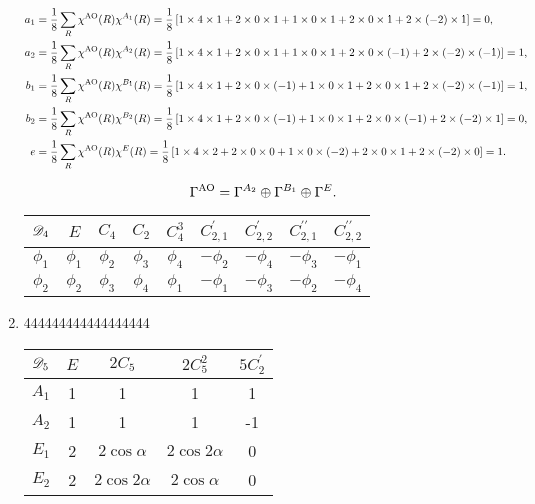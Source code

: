 \documentclass[a4paper]{book}
\newcommand{\AO}{{\rm AO}}
\begin{document}
\begin{solution}
\begin{enumerate}[label=(\alph*)]
		\begin{align*}
		a_1 &= \frac{1}{8} \sum_{R} \chi^{\AO}(R) \chi^{A_1}(R) = \frac{1}{8} \left[ 1 \times 4 \times 1 + 2 \times 0 \times 1 + 1 \times 0 \times 1 + 2 \times 0 \times 1 + 2 \times (-2) \times 1 \right] = 0, \\		
		a_2 &= \frac{1}{8} \sum_{R} \chi^{\AO}(R) \chi^{A_2}(R) = \frac{1}{8} \left[ 1 \times 4 \times 1 + 2 \times 0 \times 1 + 1 \times 0 \times 1 + 2 \times 0 \times (-1) + 2 \times (-2) \times (-1) \right] = 1, \\
		b_1 &= \frac{1}{8} \sum_{R} \chi^{\AO}(R) \chi^{B_1}(R) = \frac{1}{8} \left[ 1 \times 4 \times 1 + 2 \times 0 \times (-1) + 1 \times 0 \times 1 + 2 \times 0 \times 1 + 2 \times (-2) \times (-1) \right] = 1, \\		
		b_2 &= \frac{1}{8} \sum_{R} \chi^{\AO}(R) \chi^{B_2}(R) = \frac{1}{8} \left[ 1 \times 4 \times 1 + 2 \times 0 \times (-1) + 1 \times 0 \times 1 + 2 \times 0 \times (-1) + 2 \times (-2) \times 1 \right] = 0, \\
		e &= \frac{1}{8} \sum_{R} \chi^{\AO}(R) \chi^{E}(R) = \frac{1}{8} \left[ 1 \times 4 \times 2 + 2 \times 0 \times 0 + 1 \times 0 \times (-2) + 2 \times 0 \times 1 + 2 \times (-2) \times 0 \right] = 1.
		\end{align*}
		
		\begin{equation*}
			\Gamma^{\AO} = \Gamma^{A_2} \oplus \Gamma^{B_1} \oplus \Gamma^{E}.
		\end{equation*}
		
		\begin{center}
		\begin{tabular}{ccccccccc}\hline
	$\mathscr{D}_{\rm 4}$ & $E$ & $C_4$ & $C_2$ & $C^3_4$	&	$C^\prime_{2,1}$	&	$C^\prime_{2,2}$ &	$C^{\prime\prime}_{2,1}$	&	$C^{\prime\prime}_{2,2}$	\\ \hline
			$\phi_1$	&	$\phi_1$	&	$\phi_2$	&	$\phi_3$	&	$\phi_4$	&	$-\phi_2$	&	$-\phi_4$	&	$-\phi_3$	&	$-\phi_1$	\\
			$\phi_2$	&	$\phi_2$	&	$\phi_3$	&	$\phi_4$	&	$\phi_1$	&	$-\phi_1$	&	$-\phi_3$	&	$-\phi_2$	&	$-\phi_4$	\\ \hline
		\end{tabular}
		\end{center}
		
		
		
		\item 444444444444444444
		
		\begin{center}
		\begin{tabular}{ccccc}\hline
	$\mathscr{D}_{\rm 5}$ & $E$ & $2C_5$ &	$2C^2_5$	& $5C^\prime_2$ \\ \hline
			$A_1$	&	1	&	1	&	1	&	1	\\
			$A_2$	&	1	&	1	&	1	&	-1	\\
			$E_1$ 	&	2	&$2\cos\alpha$	&	$2\cos2\alpha$	&	0	\\
			$E_2$ 	&	2	&$2\cos2\alpha$	&	$2\cos\alpha$	&	0	\\ \hline
		\end{tabular}
		\end{center}
		

\end{enumerate}
\end{solution}
\end{document}
